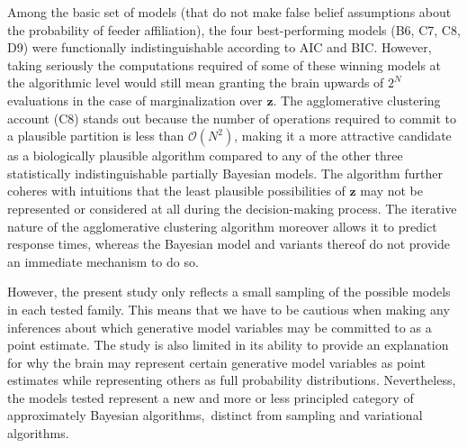 \documentclass{article}
\begin{document}
Among the basic set of models (that do not make false belief assumptions about the probability of feeder affiliation),  the four best-performing models (B6, C7, C8, D9) were  functionally indistinguishable according to AIC and BIC. However, taking seriously the computations required of some of these winning models at the algorithmic level would still mean granting the brain upwards of $2^N$ evaluations in the case of marginalization over $\mathbf{z}$. 
The agglomerative clustering account (C8) stands out because the number of operations required to commit to a plausible partition is less than $\mathcal{O}(N^2)$, making it a more attractive candidate as a biologically plausible algorithm compared to any of the other three statistically indistinguishable partially Bayesian models. The algorithm further coheres with intuitions that the least plausible possibilities of $\mathbf{z}$ may not be represented or considered at all during the decision-making process. The iterative nature of the agglomerative clustering algorithm moreover allows it to predict response times, whereas the Bayesian model and variants thereof do not provide an immediate mechanism to do so.
 
However, the present study only reflects a small sampling of the possible models in each tested family. This means that we have to be cautious when making any inferences about which generative model variables may be committed to as a point estimate. The study is also limited in its ability to provide an explanation for why the brain may represent certain generative model variables as point estimates while representing others as full probability distributions.  Nevertheless, the models tested represent a new and more or less principled category of approximately Bayesian algorithms, distinct from sampling and variational algorithms.


\end{document}
